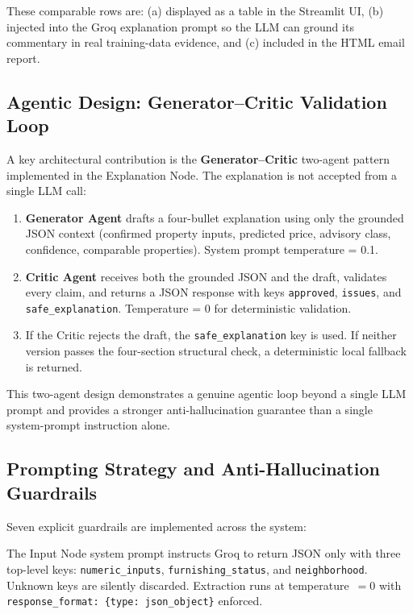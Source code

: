 \documentclass[12pt,a4paper]{article}
\begin{document}
These comparable rows are: (a) displayed as a table in the Streamlit UI, (b) injected into the Groq explanation prompt so the LLM can ground its commentary in real training-data evidence, and (c) included in the HTML email report.

\subsection{Agentic Design: Generator--Critic Validation Loop}

A key architectural contribution is the \textbf{Generator--Critic} two-agent pattern implemented in the Explanation Node. The explanation is not accepted from a single LLM call:

\begin{enumerate}[label=\arabic*., leftmargin=*, itemsep=4pt]
  \item \textbf{Generator Agent} drafts a four-bullet explanation using only the grounded JSON context (confirmed property inputs, predicted price, advisory class, confidence, comparable properties). System prompt temperature = 0.1.
  \item \textbf{Critic Agent} receives both the grounded JSON and the draft, validates every claim, and returns a JSON response with keys \texttt{approved}, \texttt{issues}, and \texttt{safe\_explanation}. Temperature = 0 for deterministic validation.
  \item If the Critic rejects the draft, the \texttt{safe\_explanation} key is used. If neither version passes the four-section structural check, a deterministic local fallback is returned.
\end{enumerate}

This two-agent design demonstrates a genuine agentic loop beyond a single LLM prompt and provides a stronger anti-hallucination guarantee than a single system-prompt instruction alone.

\subsection{Prompting Strategy and Anti-Hallucination Guardrails}

Seven explicit guardrails are implemented across the system:

\begin{guardrailbox}[title=Guardrail 1 \textemdash{} Schema-Locked Input Extraction]
The Input Node system prompt instructs Groq to return JSON only with three top-level keys: \texttt{numeric\_inputs}, \texttt{furnishing\_status}, and \texttt{neighborhood}. Unknown keys are silently discarded. Extraction runs at temperature~$= 0$ with \texttt{response\_format: \{type: json\_object\}} enforced.
\end{guardrailbox}
\end{document}
